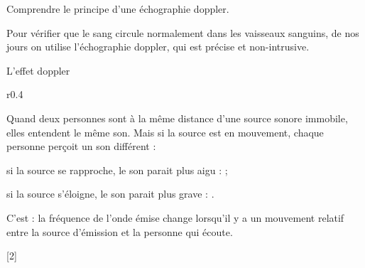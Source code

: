 \teteTermStssImag
{}

\begin{objectifs}
  \item Comprendre le principe d'une échographie doppler.
\end{objectifs}

\begin{contexte}
  Pour vérifier que le sang circule normalement dans les vaisseaux sanguins, de nos jours on utilise l'échographie doppler, qui est précise et non-intrusive.
  
\end{contexte}


\begin{doc}{L'effet doppler}
  \begin{wrapfigure}[4]{r}{0.4\linewidth}
    \centering
    \vspace*{-35pt}
  \end{wrapfigure}
  
  Quand deux personnes sont à la même distance d'une source sonore immobile, elles entendent le même son.
  Mais si la source est en mouvement, chaque personne perçoit un son différent :
  \begin{listePoints}
    \item si la source se rapproche, le son parait plus aigu :  ;
    \item si la source s'éloigne, le son parait plus grave : .
  \end{listePoints}
  
  \begin{importants}  
    C'est  : la fréquence de l'onde émise change lorsqu'il y a un mouvement relatif entre la source d'émission et la personne qui écoute.
  \end{importants}
\end{doc}


[2]

